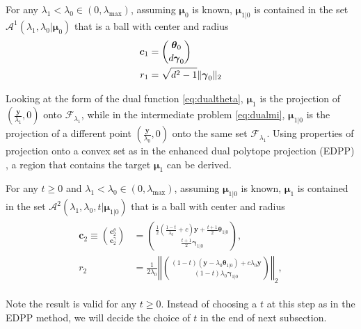 \begin{theorem}
    \label{thm:1.1}
    For any $\lambda_1<\lambda_{0}\in (0,\lambda_\textrm{max})$, assuming $\boldsymbol\mu_0$ is known, $\boldsymbol\mu_{1|0}$ is contained in the set $\mathcal{A}^1(\lambda_1,\lambda_0|\boldsymbol\mu_0)$ that is a ball with center and radius
    \begin{gather}
        \begin{aligned}
            \boldsymbol c_1&=\binom{\boldsymbol\theta_0}{d\boldsymbol\gamma_0}\\
            r_1&=\sqrt{d^2-1}\lVert\boldsymbol\gamma_0\rVert_2
        \end{aligned}
    \end{gather}
\end{theorem}

Looking at the form of the dual function \eqref{eq:dualtheta}, $\boldsymbol\mu_1$ is the projection of $(\frac{\boldsymbol y}{\lambda_1},0)$ onto $\mathcal{F}_{\lambda_1}$, while in the intermediate problem \eqref{eq:dualmi}, $\boldsymbol\mu_{1|0}$ is the projection of a different point $(\frac{\boldsymbol y}{\lambda_0},0)$ onto the same set $\mathcal{F}_{\lambda_1}$. Using properties of projection onto a convex set as in the enhanced dual polytope projection (EDPP) \citep{wang2013lasso}, a region that contains the target $\boldsymbol\mu_1$ can be derived.

\begin{theorem}
    \label{thm:1.2}
    For any $t\geq0$ and $\lambda_1<\lambda_{0}\in (0,\lambda_\textrm{max})$, assuming $\boldsymbol\mu_{1|0}$ is known, $\boldsymbol\mu_1$ is contained in the set $\mathcal{A}^2(\lambda_1,\lambda_0,t|\boldsymbol\mu_{1|0})$ that is a ball with center and radius
    \begin{gather}
        \begin{aligned}
            \boldsymbol c_2\equiv\binom{\boldsymbol c_2^\theta}{\boldsymbol c_2^\gamma}&=\binom{\frac{1}{2}(\frac{1-t}{\lambda_0}+c)\boldsymbol y+\frac{t+1}{2}\boldsymbol\theta_{1|0}}{\frac{t+1}{2}\boldsymbol\gamma_{1|0}},\\
            r_2&=\frac{1}{2\lambda_0}\left\Vert\binom{(1-t)(\boldsymbol y-\lambda_0\boldsymbol\theta_{1|0})+c\lambda_0\boldsymbol y}{(1-t)\lambda_0\boldsymbol\gamma_{1|0}}\right\Vert_2,
        \end{aligned}
    \end{gather}
\end{theorem}

Note the result is valid for any $t\geq 0$. Instead of choosing a $t$ at this step as in the EDPP method, we will decide the choice of $t$ in the end of next subsection.

